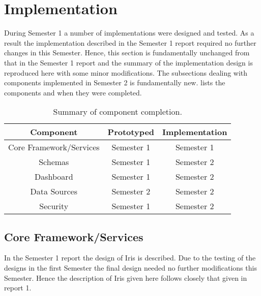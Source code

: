 \documentclass[12pt,a4paper,titlepage]{report}
\begin{document}
\chapter{Implementation}
During Semester 1 a number of implementations were designed and tested. As a result the implementation described in the Semester 1 report required no further changes in this Semester. Hence, this section is fundamentally unchanged from that in the Semester 1 report and the summary of the implementation design is reproduced here with some minor modifications. The subsections dealing with components implemented in Semester 2 is fundamentally new.  lists the components and when they were completed. 
\begin{table}[H]
\centering
\small
\setlength\tabcolsep{6pt}
 \begin{tabular}{|c|c|c|}
 \hline
 Component & Prototyped & Implementation\\
 \hline\hline
 Core Framework/Services & Semester 1 & Semester 1\\ 
 \hline
 Schemas & Semester 1 & Semester 2\\ 
 \hline
 Dashboard & Semester 1 & Semester 2\\ 
 \hline
 Data Sources & Semester 2 & Semester 2\\ 
 \hline
 Security & Semester 1 & Semester 2\\ 
 \hline
\end{tabular}
\caption{Summary of component completion.}
\label{table:component:completion}
\end{table}

\section{Core Framework/Services}
In the Semester 1 report the design of Iris is described. Due to the testing of the designs in the first Semester the final design needed no further modifications this Semester. Hence the description of Iris given here follows closely that given in report 1.
\end{document}
